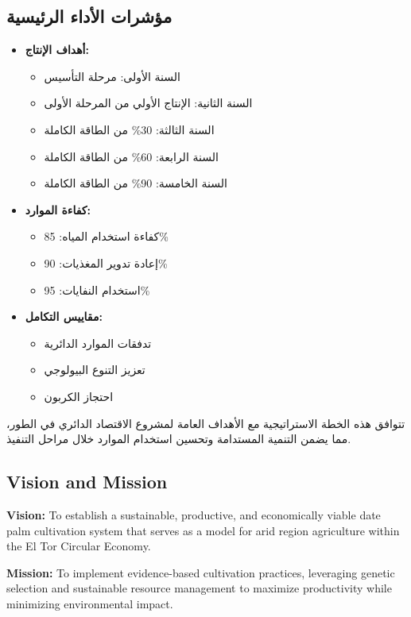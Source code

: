 \subsection{مؤشرات الأداء الرئيسية}
\begin{itemize}
    \item \textbf{أهداف الإنتاج:}
    \begin{itemize}
        \item السنة الأولى: مرحلة التأسيس
        \item السنة الثانية: الإنتاج الأولي من المرحلة الأولى
        \item السنة الثالثة: 30\% من الطاقة الكاملة
        \item السنة الرابعة: 60\% من الطاقة الكاملة
        \item السنة الخامسة: 90\% من الطاقة الكاملة
    \end{itemize}
    \item \textbf{كفاءة الموارد:}
    \begin{itemize}
        \item كفاءة استخدام المياه: 85\%
        \item إعادة تدوير المغذيات: 90\%
        \item استخدام النفايات: 95\%
    \end{itemize}
    \item \textbf{مقاييس التكامل:}
    \begin{itemize}
        \item تدفقات الموارد الدائرية
        \item تعزيز التنوع البيولوجي
        \item احتجاز الكربون
    \end{itemize}
\end{itemize}

تتوافق هذه الخطة الاستراتيجية مع الأهداف العامة لمشروع الاقتصاد الدائري في الطور، مما يضمن التنمية المستدامة وتحسين استخدام الموارد خلال مراحل التنفيذ.

\subsection{Vision and Mission}
\textbf{Vision:} To establish a sustainable, productive, and economically viable date palm cultivation system that serves as a model for arid region agriculture within the El Tor Circular Economy.

\textbf{Mission:} To implement evidence-based cultivation practices, leveraging genetic selection and sustainable resource management to maximize productivity while minimizing environmental impact.

